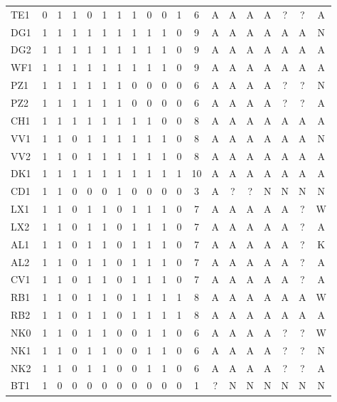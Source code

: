 {\begin{longtable}{@{}lcccccccccccccccccc@{}}
TE1 & 0 & 1 & 1 & 0 & 1 & 1 & 1 & 0 & 0 & 1 & 6 & A & A & A & A & ? & ? & A \\
DG1 & 1 & 1 & 1 & 1 & 1 & 1 & 1 & 1 & 1 & 0 & 9 & A & A & A & A & A & A & N \\
DG2 & 1 & 1 & 1 & 1 & 1 & 1 & 1 & 1 & 1 & 0 & 9 & A & A & A & A & A & A & A \\
WF1 & 1 & 1 & 1 & 1 & 1 & 1 & 1 & 1 & 1 & 0 & 9 & A & A & A & A & A & A & A \\
PZ1 & 1 & 1 & 1 & 1 & 1 & 1 & 0 & 0 & 0 & 0 & 6 & A & A & A & A & ? & ? & N \\
PZ2 & 1 & 1 & 1 & 1 & 1 & 1 & 0 & 0 & 0 & 0 & 6 & A & A & A & A & ? & ? & A \\
CH1 & 1 & 1 & 1 & 1 & 1 & 1 & 1 & 1 & 0 & 0 & 8 & A & A & A & A & A & A & A \\
VV1 & 1 & 1 & 0 & 1 & 1 & 1 & 1 & 1 & 1 & 0 & 8 & A & A & A & A & A & A & N \\
VV2 & 1 & 1 & 0 & 1 & 1 & 1 & 1 & 1 & 1 & 0 & 8 & A & A & A & A & A & A & A \\
DK1 & 1 & 1 & 1 & 1 & 1 & 1 & 1 & 1 & 1 & 1 & 10 & A & A & A & A & A & A & A \\
CD1 & 1 & 1 & 0 & 0 & 0 & 1 & 0 & 0 & 0 & 0 & 3 & A & ? & ? & N & N & N & N \\
LX1 & 1 & 1 & 0 & 1 & 1 & 0 & 1 & 1 & 1 & 0 & 7 & A & A & A & A & A & ? & W \\
LX2 & 1 & 1 & 0 & 1 & 1 & 0 & 1 & 1 & 1 & 0 & 7 & A & A & A & A & A & ? & A \\
AL1 & 1 & 1 & 0 & 1 & 1 & 0 & 1 & 1 & 1 & 0 & 7 & A & A & A & A & A & ? & K \\
AL2 & 1 & 1 & 0 & 1 & 1 & 0 & 1 & 1 & 1 & 0 & 7 & A & A & A & A & A & ? & A \\
CV1 & 1 & 1 & 0 & 1 & 1 & 0 & 1 & 1 & 1 & 0 & 7 & A & A & A & A & A & ? & A \\
RB1 & 1 & 1 & 0 & 1 & 1 & 0 & 1 & 1 & 1 & 1 & 8 & A & A & A & A & A & A & W \\
RB2 & 1 & 1 & 0 & 1 & 1 & 0 & 1 & 1 & 1 & 1 & 8 & A & A & A & A & A & A & A \\
NK0 & 1 & 1 & 0 & 1 & 1 & 0 & 0 & 1 & 1 & 0 & 6 & A & A & A & A & ? & ? & W \\
NK1 & 1 & 1 & 0 & 1 & 1 & 0 & 0 & 1 & 1 & 0 & 6 & A & A & A & A & ? & ? & N \\
NK2 & 1 & 1 & 0 & 1 & 1 & 0 & 0 & 1 & 1 & 0 & 6 & A & A & A & A & ? & ? & A \\
BT1 & 1 & 0 & 0 & 0 & 0 & 0 & 0 & 0 & 0 & 0 & 1 & ? & N & N & N & N & N & N \\

\end{longtable}}
